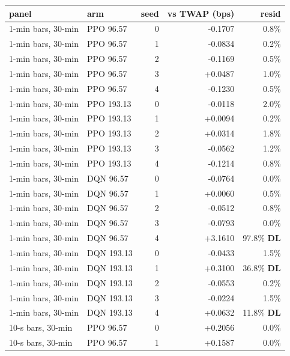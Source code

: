 \documentclass[11pt]{article}
\begin{document}
\begin{center}\scriptsize%
\begin{longtable}{llrrr}
\toprule
panel & arm & seed & vs TWAP (bps) & resid \\
\midrule
\endhead
1-min bars, 30-min & PPO 96.57 & 0 & -0.1707 & 0.8\% \\
1-min bars, 30-min & PPO 96.57 & 1 & -0.0834 & 0.2\% \\
1-min bars, 30-min & PPO 96.57 & 2 & -0.1169 & 0.5\% \\
1-min bars, 30-min & PPO 96.57 & 3 & +0.0487 & 1.0\% \\
1-min bars, 30-min & PPO 96.57 & 4 & -0.1230 & 0.5\% \\
1-min bars, 30-min & PPO 193.13 & 0 & -0.0118 & 2.0\% \\
1-min bars, 30-min & PPO 193.13 & 1 & +0.0094 & 0.2\% \\
1-min bars, 30-min & PPO 193.13 & 2 & +0.0314 & 1.8\% \\
1-min bars, 30-min & PPO 193.13 & 3 & -0.0562 & 1.2\% \\
1-min bars, 30-min & PPO 193.13 & 4 & -0.1214 & 0.8\% \\
1-min bars, 30-min & DQN 96.57 & 0 & -0.0764 & 0.0\% \\
1-min bars, 30-min & DQN 96.57 & 1 & +0.0060 & 0.5\% \\
1-min bars, 30-min & DQN 96.57 & 2 & -0.0512 & 0.8\% \\
1-min bars, 30-min & DQN 96.57 & 3 & -0.0793 & 0.0\% \\
1-min bars, 30-min & DQN 96.57 & 4 & +3.1610 & 97.8\% \textbf{DL} \\
1-min bars, 30-min & DQN 193.13 & 0 & -0.0433 & 1.5\% \\
1-min bars, 30-min & DQN 193.13 & 1 & +0.3100 & 36.8\% \textbf{DL} \\
1-min bars, 30-min & DQN 193.13 & 2 & -0.0553 & 0.2\% \\
1-min bars, 30-min & DQN 193.13 & 3 & -0.0224 & 1.5\% \\
1-min bars, 30-min & DQN 193.13 & 4 & +0.0632 & 11.8\% \textbf{DL} \\
\midrule
10-s bars, 30-min & PPO 96.57 & 0 & +0.2056 & 0.0\% \\
10-s bars, 30-min & PPO 96.57 & 1 & +0.1587 & 0.0\% \\

\end{longtable}
\end{center}
\end{document}
